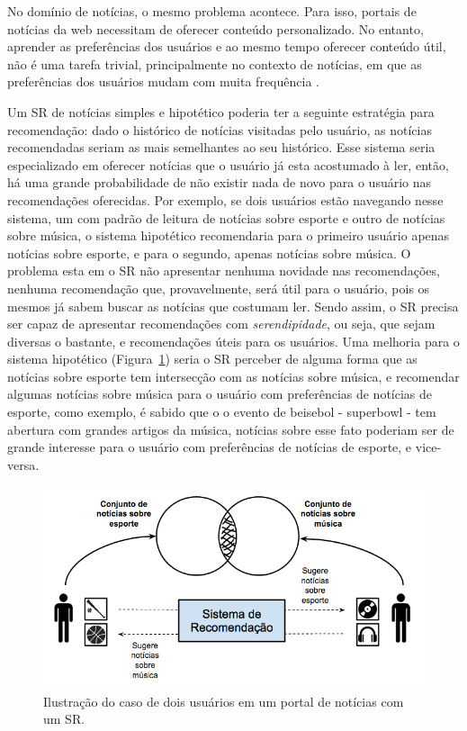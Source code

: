 \documentclass[normaltoc, espacoumemeio, pnumromarab,ruledheader]{abnt}
\begin{document}
No domínio de notícias, o mesmo problema acontece.
Para isso, portais de notícias da web necessitam de oferecer conteúdo personalizado.
No entanto, aprender as preferências dos usuários e ao mesmo tempo oferecer conteúdo útil, não é uma tarefa trivial, principalmente no contexto de notícias, em que as preferências dos usuários mudam com muita frequência \cite{Li2011}.

Um SR de notícias simples e hipotético poderia ter a seguinte estratégia para recomendação: dado o histórico de notícias visitadas pelo usuário, as notícias recomendadas seriam as mais semelhantes ao seu histórico.
Esse sistema seria especializado em oferecer notícias que o usuário já esta acostumado à ler, então, há uma grande probabilidade de não existir nada de novo para o usuário nas recomendações oferecidas.
Por exemplo, se dois usuários estão navegando nesse sistema, um com padrão de leitura de notícias sobre esporte e outro de notícias sobre música, o sistema hipotético recomendaria para o primeiro usuário apenas notícias sobre esporte, e para o segundo, apenas notícias sobre música.
O problema esta em o SR não apresentar nenhuma novidade nas recomendações, nenhuma recomendação que, provavelmente, será útil para o usuário, pois os mesmos já sabem buscar as notícias que costumam ler.
Sendo assim, o SR precisa ser capaz de apresentar recomendações com \textit{serendipidade}, ou seja, que sejam diversas o bastante, e recomendações úteis para os usuários.
Uma melhoria para o sistema hipotético (Figura~\ref{fig:story}) seria o SR perceber de alguma forma que as notícias sobre esporte tem intersecção com as notícias sobre música, e recomendar algumas notícias sobre música para o usuário com preferências de notícias de esporte, como exemplo, é sabido que o o evento de beisebol - superbowl - tem abertura com grandes artigos da música, notícias sobre esse fato poderiam ser de grande interesse para o usuário com preferências de notícias de esporte, e vice-versa.

\begin{figure}[h]
\centering
\includegraphics[width=120mm]{img/story.png}
\caption{Ilustração do caso de dois usuários em um portal de notícias com um SR.}
\label{fig:story}
\end{figure}
\end{document}
